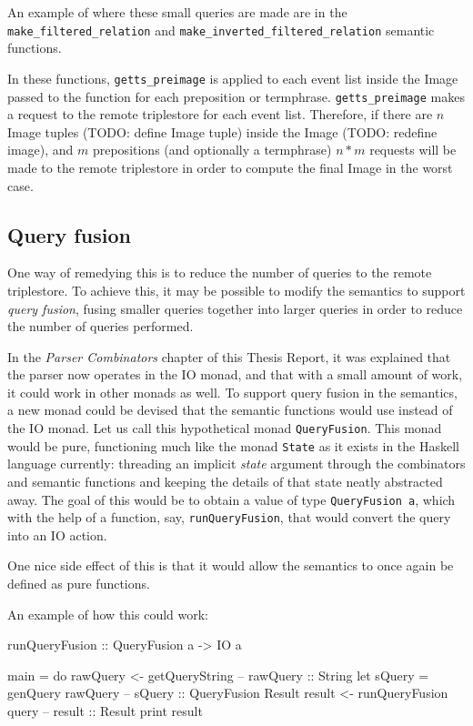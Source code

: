 \documentclass[../main.tex]{subfiles}
\begin{document}
An example of where these small queries are made are in the \texttt{make\_filtered\_relation} and \texttt{make\_inverted\_filtered\_relation} semantic functions.

In these functions, \texttt{getts\_preimage} is applied to each event list inside the Image passed to the function for each preposition or termphrase.  \texttt{getts\_preimage} makes a request to the remote triplestore for each event list.  Therefore, if there are $n$ Image tuples (TODO: define Image tuple) inside the Image (TODO: redefine image), and
$m$ prepositions (and optionally a termphrase) $n*m$ requests will be made to the remote triplestore in order to compute the final Image in the worst case.

\subsection{Query fusion}

One way of remedying this is to reduce the number of queries to the remote triplestore.  To achieve this, it may be possible to modify the semantics to
support {\em query fusion}, fusing smaller queries together into larger queries in order to reduce the number of queries performed.

In the {\em Parser Combinators} chapter of this Thesis Report, it was explained that the parser now operates in the IO monad, and that with a small amount of work, it could
work in other monads as well.  To support query fusion in the semantics, a new monad could be devised that the semantic functions would use instead of the IO monad.  Let us
call this hypothetical monad \texttt{QueryFusion}.  This monad would be pure, functioning much like the monad \texttt{State} as it exists in the Haskell language currently: threading an implicit {\em state} argument through the combinators and semantic functions and keeping the details of that state neatly abstracted away.  The goal of this would be to obtain a value of type \texttt{QueryFusion a}, which with the help of a function, say, \texttt{runQueryFusion}, that would convert the query into an IO action.

One nice side effect of this is that it would allow the semantics to once again be defined as pure functions.

An example of how this could work:

\begin{code}
	
runQueryFusion :: QueryFusion a -> IO a

main = do
	rawQuery <- getQueryString      -- rawQuery :: String
	let sQuery = genQuery rawQuery  -- sQuery   :: QueryFusion Result
	result <- runQueryFusion query  -- result   :: Result
	print result

\end{code}
\end{document}
